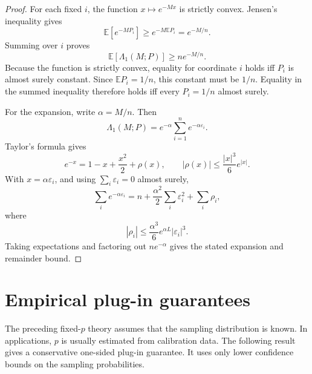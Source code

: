 \documentclass[11pt]{article}
\theoremstyle{definition}
\theoremstyle{remark}
\newcommand{\E}{\mathbb E}
\newcommand{\1}{\mathbf 1}
\begin{document}
\begin{proof}
For each fixed \(i\), the function \(x\mapsto e^{-Mx}\) is strictly convex.  Jensen's inequality gives
\[
  \E[e^{-MP_i}]\ge e^{-M\E P_i}=e^{-M/n}.
\]
Summing over \(i\) proves
\[
  \E[\Lambda_1(M;P)]\ge n e^{-M/n}.
\]
Because the function is strictly convex, equality for coordinate \(i\) holds iff \(P_i\) is almost surely constant.  Since \(\E P_i=1/n\), this constant must be \(1/n\).  Equality in the summed inequality therefore holds iff every \(P_i=1/n\) almost surely.

For the expansion, write \(\alpha=M/n\).  Then
\[
  \Lambda_1(M;P)=e^{-\alpha}\sum_{i=1}^n e^{-\alpha\varepsilon_i}.
\]
Taylor's formula gives
\[
  e^{-x}=1-x+\frac{x^2}{2}+\rho(x),
  \qquad |\rho(x)|\le\frac{|x|^3}{6}e^{|x|}.
\]
With \(x=\alpha\varepsilon_i\), and using \(\sum_i\varepsilon_i=0\) almost surely,
\[
  \sum_i e^{-\alpha\varepsilon_i}
  =n+\frac{\alpha^2}{2}\sum_i\varepsilon_i^2+\sum_i\rho_i,
\]
where
\[
  |\rho_i|\le\frac{\alpha^3}{6}e^{\alpha L}|\varepsilon_i|^3.
\]
Taking expectations and factoring out \(n e^{-\alpha}\) gives the stated expansion and remainder bound.
\end{proof}

\section{Empirical plug-in guarantees}

The preceding fixed-\(p\) theory assumes that the sampling distribution is known.  In applications, \(p\) is usually estimated from calibration data.  The following result gives a conservative one-sided plug-in guarantee.  It uses only lower confidence bounds on the sampling probabilities.
\end{document}
